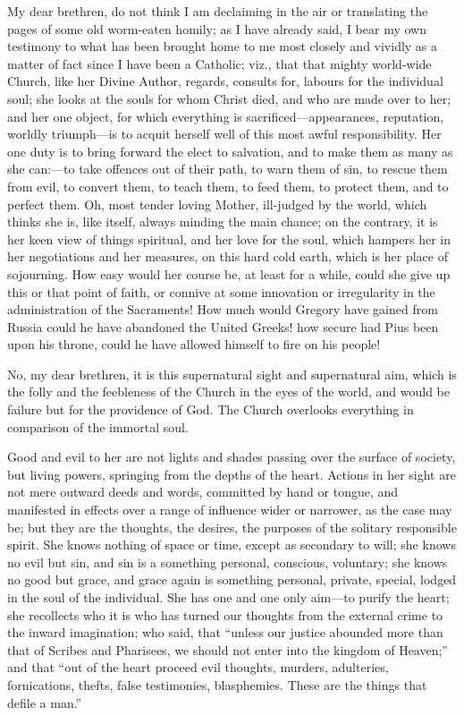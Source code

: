My dear brethren, do not think I am declaiming in the air or
translating the pages of some old worm-eaten homily; as I have already
said, I bear my own testimony to what has been brought home to me most
closely and vividly as a matter of fact since I have been a Catholic;
viz., that that mighty world-wide Church, like her Divine Author,
regards, consults for, labours for the individual soul; she looks at
the souls for whom Christ died, and who are made over to her; and her
one object, for which everything is sacrificed—appearances, reputation, worldly triumph—is to acquit herself well of this most
awful responsibility. Her one duty is to bring forward the elect to
salvation, and to make them as many as she can:—to take offences out
of their path, to warn them of sin, to rescue them from evil, to
convert them, to teach them, to feed them, to protect them, and to
perfect them. Oh, most tender loving Mother, ill-judged by the world,
which thinks she is, like itself, always minding the main chance; on
the contrary, it is her keen view of things spiritual, and her love
for the soul, which hampers her in her negotiations and her measures,
on this hard cold earth, which is her place of sojourning. How easy
would her course be, at least for a while, could she give up this or
that point of faith, or connive at some innovation or irregularity in
the administration of the Sacraments! How much would Gregory have
gained from Russia could he have abandoned the United Greeks! how
secure had Pius been upon his throne, could he have allowed himself to
fire on his people!

No, my dear brethren, it is this supernatural sight and
supernatural aim, which is the folly and the feebleness of the Church
in the eyes of the world, and would be failure but for the providence
of God. The Church overlooks everything in comparison of the immortal
soul.

Good and evil to her are not lights and shades passing over the
surface of society, but living powers, springing from the depths of
the heart. Actions in her sight are not mere outward deeds and words,
committed by hand or tongue, and manifested in effects over a range of
influence wider or narrower, as the case may be; but they are the
thoughts, the desires, the purposes of the solitary responsible
spirit. She knows nothing of space or time, except as secondary to
will; she knows no evil but sin, and sin is a something personal,
conscious, voluntary; she knows no good but grace, and grace again is
something personal, private, special, lodged in the soul of the
individual. She has one and one only aim—to purify the heart; she
recollects who it is who has turned our thoughts from the external
crime to the inward imagination; who said, that ``unless our
justice abounded more than that of Scribes and Pharisees, we should
not enter into the kingdom of Heaven;'' and that ``out of the
heart proceed evil thoughts, murders, adulteries, fornications,
thefts, false testimonies, blasphemies. These are the things that
defile a man.''

